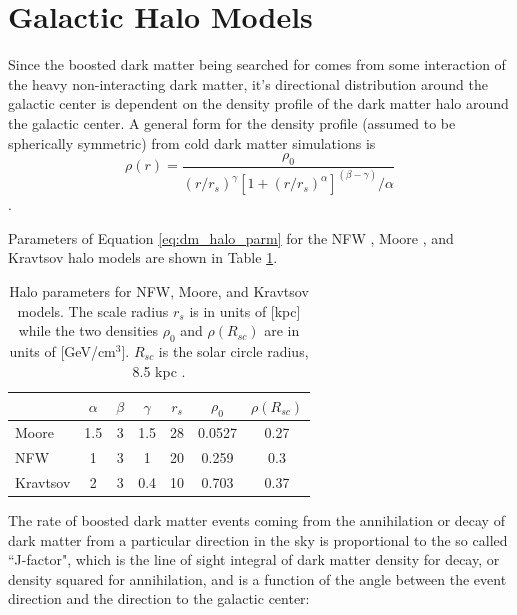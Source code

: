 \section{Galactic Halo Models}
\label{sec:halo_models}
Since the boosted dark matter being searched for comes from some interaction of the heavy non-interacting dark matter, it's directional distribution around the galactic center is dependent on the density profile of the dark matter halo around the galactic center.  A general form for the density profile (assumed to be spherically symmetric) from cold dark matter simulations is \cite{Yuksel:2007jx}
\begin{equation}
\rho(r)=\frac{\rho_0}{(r/r_s)^\gamma [1+(r/r_s)^\alpha]^(\beta-\gamma)/\alpha}
\label{eq:dm_halo_parm}
\end{equation}.



Parameters of Equation \ref{eq:dm_halo_parm} for the NFW \cite{Navarro:1996ce}, Moore \cite{Moore:1999kx}, and Kravtsov \cite{Kravtsov:1998it} halo models are shown in Table \ref{tab:halo_parms}.
\begin{table}[ht]
\begin{tabular}{lcccccc}
\hline\hline
&$\alpha$&$\beta$&$\gamma$&$r_s$&   $\rho_0$ &   $\rho(R_{sc})$ \\
\hline
Moore & 1.5&3&1.5&28&0.0527&0.27\\
NFW&1&3&1&20&0.259&0.3\\
Kravtsov&2&3&0.4&10&0.703&0.37\\
\hline
\end{tabular}

\caption{Halo parameters for NFW, Moore, and Kravtsov models.  The scale radius $r_s$ is in units of [kpc] while the two densities $\rho_0$ and  $\rho(R_{sc})$ are in units of [GeV/cm$^3$].  $R_{sc}$ is the solar circle radius, 8.5 kpc  \cite{Yuksel:2007jx}.}
\label{tab:halo_parms}
\end{table}

The rate of boosted dark matter events coming from the annihilation or decay of dark matter from a particular direction in the sky is proportional to the so called ``J-factor", which is the line of sight integral of dark matter density for decay, or density squared for annihilation, and is a function of the angle between the event direction and the direction to the galactic center:

